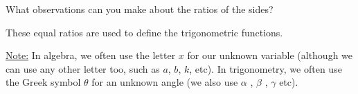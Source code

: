     \par
      \label{m39405*id79075}What observations can you make about the ratios of the sides?\par 
      \label{m39405*id79081}These equal ratios are used to define the trigonometric functions.\par 
      \label{m39405*id79087}\uline{Note:} In algebra, we often use the letter \begin{math}x\end{math} for our unknown variable (although we can use any other letter too, such as \begin{math}a\end{math}, \begin{math}b\end{math}, \begin{math}k\end{math}, etc). In trigonometry, we often use the Greek symbol \begin{math}\theta \end{math} for an unknown angle (we also use \begin{math}\alpha \end{math} , \begin{math}\beta \end{math} , \begin{math}\gamma \end{math} etc). \par 
  \label{m39405**end}
%     
%     
%     
    \label{m39408*cid5}
